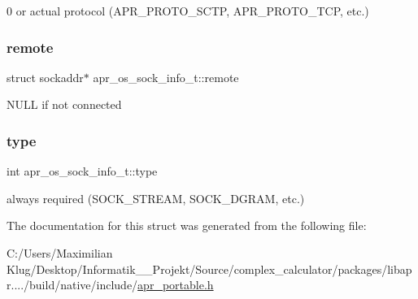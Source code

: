 0 or actual protocol (A\+P\+R\+\_\+\+P\+R\+O\+T\+O\+\_\+\+S\+C\+TP, A\+P\+R\+\_\+\+P\+R\+O\+T\+O\+\_\+\+T\+CP, etc.) \mbox{\label{structapr__os__sock__info__t_ae71fe14a5eb9141fc4ad0a6d0a91f17e}} 
\subsubsection{\texorpdfstring{remote}{remote}}
{\footnotesize\ttfamily struct sockaddr$\ast$ apr\+\_\+os\+\_\+sock\+\_\+info\+\_\+t\+::remote}

N\+U\+LL if not connected \mbox{\label{structapr__os__sock__info__t_a248fb394cd644b31619f44de0936aa04}} 
\subsubsection{\texorpdfstring{type}{type}}
{\footnotesize\ttfamily int apr\+\_\+os\+\_\+sock\+\_\+info\+\_\+t\+::type}

always required (S\+O\+C\+K\+\_\+\+S\+T\+R\+E\+AM, S\+O\+C\+K\+\_\+\+D\+G\+R\+AM, etc.) 

The documentation for this struct was generated from the following file\+:\begin{DoxyCompactItemize}
\item 
C\+:/\+Users/\+Maximilian Klug/\+Desktop/\+Informatik\+\_\+\_\+\+Projekt/\+Source/complex\+\_\+calculator/packages/libapr..../build/native/include/\mbox{\hyperlink{apr__portable_8h}{apr\+\_\+portable.\+h}}\end{DoxyCompactItemize}
